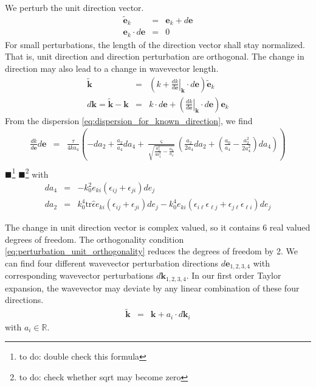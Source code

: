 \documentclass[12pt,a4paper,twoside,openright,BCOR10mm,headsepline,titlepage,abstracton,chapterprefix,final]{scrreprt}
\newcommand\Vector[1]{{\mathbf{#1}}}
\newcommand\wavenumber{k}
\newcommand\Wavevector{\Vector{\wavenumber}}
\newcommand\Tensor[1]{\hat{#1}}
\newcommand\scalarrelativepermittivity{\epsilon}
\newcommand\relativepermittivity{\Tensor{\scalarrelativepermittivity}}
\newcommand{\remark}[1]{{\color{red}$\blacksquare$}\footnote{{\color{red}#1}}}
\begin{document}
We perturb the unit direction vector. 
\begin{eqnarray}
 \tilde{\Vector{e}}_\wavenumber &=& \Vector{e}_\wavenumber + d\Vector{e} \\
 \Vector{e}_\wavenumber \cdot d\Vector{e} &=& 0 \label{eq:perturbation_unit_orthogonality}
\end{eqnarray}
For small perturbations, the length of the direction vector shall stay normalized.
That is, unit direction and direction perturbation are orthogonal.
The change in direction may also lead to a change in wavevector length.
\begin{eqnarray}
 \tilde{\Wavevector} &=& 
     \left( 
         \wavenumber + \left. \frac{d \wavenumber}{d \Vector{e}}\right|_{\Wavevector} \cdot d\Vector{e} 
     \right)
     \tilde{\Vector{e}}_\wavenumber 
 \\
 d \Wavevector = \tilde{\Wavevector} - \Wavevector &=& \wavenumber \cdot d\Vector{e} + \left( \left. \frac{d \wavenumber}{d \Vector{e}}\right|_{\Wavevector} \cdot d\Vector{e} \right) \Vector{e}_\wavenumber
\end{eqnarray}
From the dispersion \ref{eq:dispersion_for_known_direction}, we find
\begin{eqnarray}
 \frac{d \wavenumber}{d \Vector{e}} d\Vector{e} &=&
     \frac{\tau}{4 \wavenumber a_4}
     \left(
         - d a_2 + \frac{a_2}{a_4} d a_4 
         +  \frac{\varsigma}{\sqrt{\frac{a_2^2}{4 a_4^2} - \frac{a_0}{a_4}}}
                \left( \frac{a_2}{2 a_4} d a_2 + \left( \frac{a_0}{a_4} - \frac{a_2^2}{2 a_4^2} \right) d a_4 \right)
     \right)
 \nonumber\\
\end{eqnarray}
\remark{to do: double check this formula}
\remark{to do: check whether sqrt may become zero}
with
\begin{eqnarray}
 d a_4 &=& - k_0^2  e_{ki} ( \scalarrelativepermittivity_{ij} + \scalarrelativepermittivity_{ji} ) de_{j} \\
 d a_2 &=&    k_0^4 \text{tr} \relativepermittivity e_{ki} ( \scalarrelativepermittivity_{ij} + \scalarrelativepermittivity_{ji} ) de_{j} - k_0^4 e_{ki} ( \scalarrelativepermittivity_{i\ell} \scalarrelativepermittivity_{\ell j} + \scalarrelativepermittivity_{j\ell} \scalarrelativepermittivity_{\ell i} ) de_j
\end{eqnarray}

The change in unit direction vector is complex valued, so it contains 6 real valued degrees of freedom.
The orthogonality condition \eqref{eq:perturbation_unit_orthogonality} reduces the degrees of freedom by 2.
We can find four different wavevector perturbation directions $d\Vector{e}_{1,2,3,4}$
with corresponding wavevector perturbations $d \Wavevector_{1,2,3,4}$.
In our first order Taylor expansion, the wavevector may deviate by any linear combination of these four directions.
\begin{eqnarray}
 \tilde{\Wavevector} &=& \Wavevector + a_i \cdot d \Wavevector_i \label{eq:perturbed_wavevector}
\end{eqnarray}
with $a_i \in \mathbb{R}$.
\end{document}
